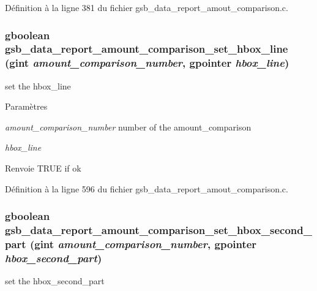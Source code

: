 Définition à la ligne 381 du fichier gsb\_\-data\_\-report\_\-amout\_\-comparison.c.

\subsubsection[{gsb\_\-data\_\-report\_\-amount\_\-comparison\_\-set\_\-hbox\_\-line}]{\setlength{\rightskip}{0pt plus 5cm}gboolean gsb\_\-data\_\-report\_\-amount\_\-comparison\_\-set\_\-hbox\_\-line (gint {\em amount\_\-comparison\_\-number}, \/  gpointer {\em hbox\_\-line})}\label{gsb__data__report__amout__comparison_8h_aaf2442526ca1c7c9f8e21c098c26083e}
set the hbox\_\-line


\begin{DoxyParams}{Paramètres}
\item[{\em amount\_\-comparison\_\-number}]number of the amount\_\-comparison \item[{\em hbox\_\-line}]\end{DoxyParams}
\begin{DoxyReturn}{Renvoie}
TRUE if ok 
\end{DoxyReturn}


Définition à la ligne 596 du fichier gsb\_\-data\_\-report\_\-amout\_\-comparison.c.

\subsubsection[{gsb\_\-data\_\-report\_\-amount\_\-comparison\_\-set\_\-hbox\_\-second\_\-part}]{\setlength{\rightskip}{0pt plus 5cm}gboolean gsb\_\-data\_\-report\_\-amount\_\-comparison\_\-set\_\-hbox\_\-second\_\-part (gint {\em amount\_\-comparison\_\-number}, \/  gpointer {\em hbox\_\-second\_\-part})}\label{gsb__data__report__amout__comparison_8h_a55b427927db85731f82e937cae02db10}
set the hbox\_\-second\_\-part


